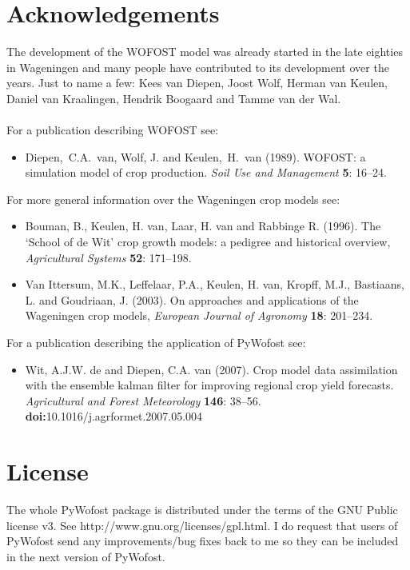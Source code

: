 \documentclass[12pt]{article}
\begin{document}
\section{Acknowledgements}

The development of the WOFOST model was already started in the late eighties in Wageningen and many people have contributed to its development over the years. Just to name a few: Kees van Diepen, Joost Wolf, Herman van Keulen, Daniel van Kraalingen, Hendrik Boogaard and Tamme van der Wal.\\
\\
For a publication describing WOFOST see:\\
\begin{itemize}
\item Diepen,~C.A.~van, Wolf, J. and Keulen,~H.~van (1989). WOFOST: a simulation model of crop production. \textit{Soil Use and Management} \textbf{5}: 16--24.
\end{itemize}
For more general information over the Wageningen crop models see:
\begin{itemize}
\item Bouman, B., Keulen, H. van, Laar, H. van and Rabbinge R. (1996). The `School of de Wit' crop growth models: a pedigree and historical overview, \textit{Agricultural Systems} \textbf{52}: 171--198.
\item Van Ittersum, M.K., Leffelaar, P.A., Keulen, H. van, Kropff, M.J., Bastiaans, L. and Goudriaan, J. (2003). On approaches and applications of the Wageningen crop models, \textit{European Journal of Agronomy} \textbf{18}: 201--234.
\end{itemize}
For a publication describing the application of PyWofost see:
\begin{itemize}
\item Wit, A.J.W. de and Diepen, C.A. van (2007). Crop model data assimilation with the ensemble kalman filter for improving regional crop yield forecasts. \textit{Agricultural and Forest Meteorology} \textbf{146}: 38--56. \textbf{doi:}10.1016/j.agrformet.2007.05.004  
\end{itemize}

\section{License}

The whole PyWofost package is distributed under the terms of the GNU Public license v3. See http://www.gnu.org/licenses/gpl.html. I do request that users of PyWofost send any improvements/bug fixes back to me so they can be included in the next version of PyWofost.
\end{document}

